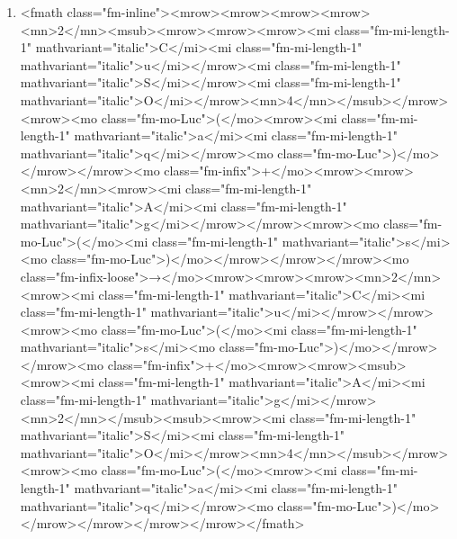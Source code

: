 \documentclass{article}
\begin{document}
\begin{enumerate}[label=(\alph*)]
\item  <fmath class="fm-inline"><mrow><mrow><mrow><mrow><mn>2</mn><msub><mrow><mrow><mrow><mi class="fm-mi-length-1" mathvariant="italic">C</mi><mi class="fm-mi-length-1" mathvariant="italic">u</mi></mrow><mi class="fm-mi-length-1" mathvariant="italic">S</mi></mrow><mi class="fm-mi-length-1" mathvariant="italic">O</mi></mrow><mn>4</mn></msub></mrow><mrow><mo class="fm-mo-Luc">(</mo><mrow><mi class="fm-mi-length-1" mathvariant="italic">a</mi><mi class="fm-mi-length-1" mathvariant="italic">q</mi></mrow><mo class="fm-mo-Luc">)</mo></mrow></mrow><mo class="fm-infix">+</mo><mrow><mrow><mn>2</mn><mrow><mi class="fm-mi-length-1" mathvariant="italic">A</mi><mi class="fm-mi-length-1" mathvariant="italic">g</mi></mrow></mrow><mrow><mo class="fm-mo-Luc">(</mo><mi class="fm-mi-length-1" mathvariant="italic">s</mi><mo class="fm-mo-Luc">)</mo></mrow></mrow></mrow><mo class="fm-infix-loose">→</mo><mrow><mrow><mrow><mn>2</mn><mrow><mi class="fm-mi-length-1" mathvariant="italic">C</mi><mi class="fm-mi-length-1" mathvariant="italic">u</mi></mrow></mrow><mrow><mo class="fm-mo-Luc">(</mo><mi class="fm-mi-length-1" mathvariant="italic">s</mi><mo class="fm-mo-Luc">)</mo></mrow></mrow><mo class="fm-infix">+</mo><mrow><mrow><msub><mrow><mi class="fm-mi-length-1" mathvariant="italic">A</mi><mi class="fm-mi-length-1" mathvariant="italic">g</mi></mrow><mn>2</mn></msub><msub><mrow><mi class="fm-mi-length-1" mathvariant="italic">S</mi><mi class="fm-mi-length-1" mathvariant="italic">O</mi></mrow><mn>4</mn></msub></mrow><mrow><mo class="fm-mo-Luc">(</mo><mrow><mi class="fm-mi-length-1" mathvariant="italic">a</mi><mi class="fm-mi-length-1" mathvariant="italic">q</mi></mrow><mo class="fm-mo-Luc">)</mo></mrow></mrow></mrow></mrow></fmath> 
\end{enumerate}
\newpage
\end{document}
